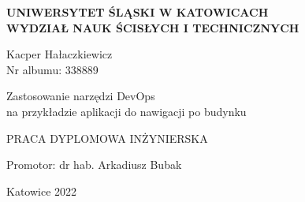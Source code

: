 \renewcommand{\maketitle}{
    \begin{titlepage}
    \begin{center}
        \textbf{UNIWERSYTET ŚLĄSKI W KATOWICACH\\
        WYDZIAŁ NAUK ŚCISŁYCH I TECHNICZNYCH\\
        }

        \vspace{1.5 cm}
        
        \Large 
        Kacper Hałaczkiewicz\\
        Nr albumu: 338889\\
        
        \vspace*{0.5 cm}
        
        Zastosowanie narzędzi DevOps \\
        na przykładzie aplikacji do nawigacji po budynku
        
        \vspace*{2.0 cm}
    
        \small
        PRACA DYPLOMOWA INŻYNIERSKA\\
        
        \vspace{8.0 cm}
    
        \large
        Promotor: dr hab. Arkadiusz Bubak\\
        
        \vspace{1 cm}
        
        \small 
        Katowice 2022\\
    \end{center}
    \clearpage
    \end{titlepage}
}

\maketitle

